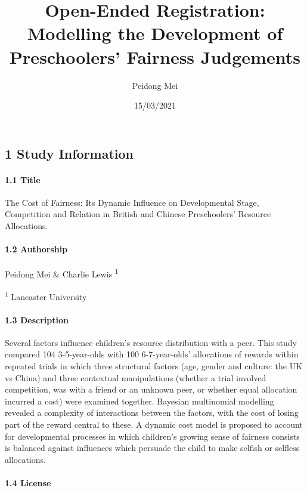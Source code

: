 \documentclass[
]{article}
\title{Open-Ended Registration: Modelling the Development of Preschoolers'
Fairness Judgements}
\author{Peidong Mei}
\date{15/03/2021}
\begin{document}
\maketitle

\hypertarget{study-information}{%
\subsection{1 Study Information}\label{study-information}}

\hypertarget{title}{%
\paragraph{1.1 Title}\label{title}}

The Cost of Fairness: Its Dynamic Influence on Developmental Stage,
Competition and Relation in British and Chinese Preschoolers' Resource
Allocations.

\hypertarget{authorship}{%
\paragraph{1.2 Authorship}\label{authorship}}

Peidong Mei \& Charlie Lewis \textsuperscript{1}

\textsuperscript{1} Lancaster University

\hypertarget{description}{%
\paragraph{1.3 Description}\label{description}}

Several factors influence children's resource distribution with a peer.
This study compared 104 3-5-year-olds with 100 6-7-year-olds'
allocations of rewards within repeated trials in which three structural
factors (age, gender and culture: the UK vs China) and three contextual
manipulations (whether a trial involved competition, was with a friend
or an unknown peer, or whether equal allocation incurred a cost) were
examined together. Bayesian multinomial modelling revealed a complexity
of interactions between the factors, with the cost of losing part of the
reward central to these. A dynamic cost model is proposed to account for
developmental processes in which children's growing sense of fairness
consists is balanced against influences which persuade the child to make
selfish or selfless allocations.

\hypertarget{license}{%
\paragraph{1.4 License}\label{license}}
\end{document}
